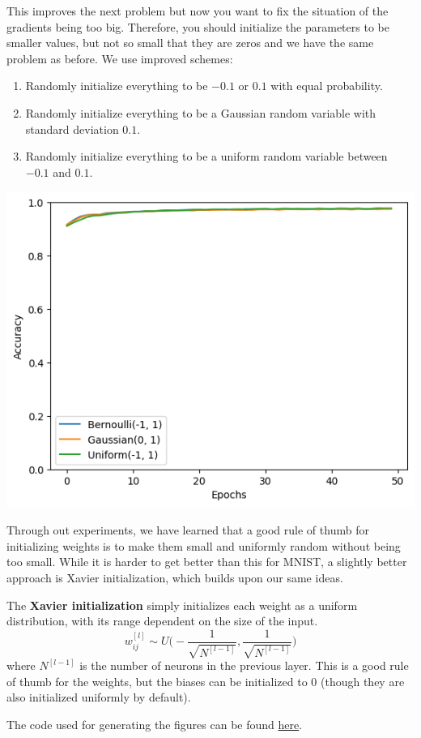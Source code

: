   \begin{example}
    This improves the next problem but now you want to fix the situation of the gradients being too big. Therefore, you should initialize the parameters to be smaller values, but not so small that they are zeros and we have the same problem as before. We use improved schemes: 
    \begin{enumerate}[itemsep=0mm] 
      \item Randomly initialize everything to be $-0.1$ or $0.1$ with equal probability. 
      \item Randomly initialize everything to be a Gaussian random variable with standard deviation $0.1$. 
      \item Randomly initialize everything to be a uniform random variable between $-0.1$ and $0.1$.
    \end{enumerate}
    \begin{center}
      \includegraphics[scale=0.5]{img/third_initialize.png}
    \end{center}
  \end{example}

  Through out experiments, we have learned that a good rule of thumb for initializing weights is to make them small and uniformly random without being too small. While it is harder to get better than this for MNIST, a slightly better approach is Xavier initialization, which builds upon our same ideas. 

  \begin{definition}
    The \textbf{Xavier initialization} simply initializes each weight as a uniform distribution, with its range dependent on the size of the input. 
    \begin{equation}
      w_{ij}^{[l]} \sim U \bigg( -\frac{1}{\sqrt{N^{[l-1]}}}, \frac{1}{\sqrt{N^{[l-1]}}} \bigg)
    \end{equation}
    where $N^{[l-1]}$ is the number of neurons in the previous layer. This is a good rule of thumb for the weights, but the biases can be initialized to $0$ (though they are also initialized uniformly by default).
  \end{definition}

  \begin{code} 
    The code used for generating the figures can be found \href{code/initialization.ipynb}{here}. 
  \end{code}

